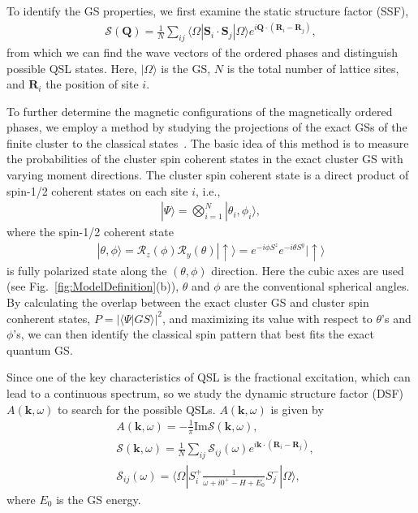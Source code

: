 \documentclass[aps,prb,reprint,amsfonts,amsmath,amssymb,showpacs,groupedaddress,superscriptaddress]{revtex4-1}
\begin{document}
To identify the GS properties, we first examine the static structure factor (SSF),
\begin{align}
    \mathcal{S}(\bm{Q}) = \frac{1}{N} \sum_{ij} \langle \Omega | \bm{S}_i \cdot \bm{S}_j | \Omega \rangle e^{i \bm{Q} \cdot (\bm{R}_i - \bm{R}_j)},
    \label{eq:SSF}
\end{align}
from which we can find the wave vectors of the ordered phases and distinguish possible QSL states. Here, $|\Omega\rangle$ is the GS, $N$ is the total number of lattice sites, and $\bm{R}_i$ the position of site $i$.

To further determine the magnetic configurations of the magnetically ordered phases, we employ a method by studying the projections of the exact GSs of the finite cluster to the classical states~\cite{PhysRevB.94.064435}. The basic idea of this method is to measure the probabilities of the cluster spin coherent states in the exact cluster GS with varying moment directions. The cluster spin coherent state is a direct product of spin-1/2 coherent states on each site $i$, i.e.,
\begin{align}
    | \Psi \rangle = \bigotimes_{i=1}^{N} | \theta_{i}, \phi_{i} \rangle,
    \label{eq:ClusterCoherentState}
\end{align}
where the spin-1/2 coherent state
\begin{align}
    | \theta, \phi \rangle = \mathcal{R}_{z}(\phi) \mathcal{R}_{y}(\theta) | \uparrow \rangle = e^{-i \phi S^z} e^{-i \theta S^y} | \uparrow \rangle
    \label{eq:Spin-1/2CoherentState}
\end{align}
is fully polarized state along the $(\theta, \phi)$ direction. Here the cubic axes are used (see Fig.~\ref{fig:ModelDefinition}(b)), $\theta$ and $\phi$ are the conventional spherical angles. By calculating the overlap between the exact cluster GS and cluster spin conherent states, $P = | \langle \Psi | GS \rangle |^2$, and maximizing its value with respect to $\theta$'s and $\phi$'s, we can then identify the classical spin pattern that best fits the exact quantum GS.

Since one of the key characteristics of QSL is the fractional excitation, which can lead to a continuous spectrum, so we study the dynamic structure factor (DSF) $A(\bm{k}, \omega)$ to search for the possible QSLs. $A(\bm{k}, \omega)$ is given by
\begin{align}
    & A(\bm{k}, \omega) = -\frac{1}{\pi} \text{Im} \mathcal{S}(\bm{k}, \omega), \label{eq:Akomega} \\
    & \mathcal{S}(\bm{k}, \omega) = \frac{1}{N} \sum_{ij} \mathcal{S}_{ij}(\omega) e^{i \bm{k} \cdot (\bm{R}_i - \bm{R}_j)}, \\
    & \mathcal{S}_{ij}(\omega) = \langle \Omega | S_i^{+} \frac{1}{\omega + i0^{+} - H + E_0} S_j^{-} | \Omega \rangle, \label{eq:GreenFunction}
\end{align}
where $E_0$ is the GS energy.
\end{document}
